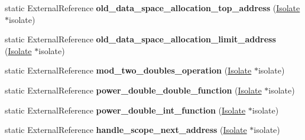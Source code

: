\begin{DoxyCompactItemize}
\item 
\hypertarget{classv8_1_1internal_1_1_b_a_s_e___e_m_b_e_d_d_e_d_a942984857e5337d7c42f8c46a2c7ce72}{}static External\+Reference {\bfseries old\+\_\+data\+\_\+space\+\_\+allocation\+\_\+top\+\_\+address} (\hyperlink{classv8_1_1internal_1_1_isolate}{Isolate} $\ast$isolate)\label{classv8_1_1internal_1_1_b_a_s_e___e_m_b_e_d_d_e_d_a942984857e5337d7c42f8c46a2c7ce72}

\item 
\hypertarget{classv8_1_1internal_1_1_b_a_s_e___e_m_b_e_d_d_e_d_a997b6a6749403f587c2a98901a559fda}{}static External\+Reference {\bfseries old\+\_\+data\+\_\+space\+\_\+allocation\+\_\+limit\+\_\+address} (\hyperlink{classv8_1_1internal_1_1_isolate}{Isolate} $\ast$isolate)\label{classv8_1_1internal_1_1_b_a_s_e___e_m_b_e_d_d_e_d_a997b6a6749403f587c2a98901a559fda}

\item 
\hypertarget{classv8_1_1internal_1_1_b_a_s_e___e_m_b_e_d_d_e_d_afcd485b57431a72f941f38e4b14450f5}{}static External\+Reference {\bfseries mod\+\_\+two\+\_\+doubles\+\_\+operation} (\hyperlink{classv8_1_1internal_1_1_isolate}{Isolate} $\ast$isolate)\label{classv8_1_1internal_1_1_b_a_s_e___e_m_b_e_d_d_e_d_afcd485b57431a72f941f38e4b14450f5}

\item 
\hypertarget{classv8_1_1internal_1_1_b_a_s_e___e_m_b_e_d_d_e_d_a2d62b10a13ad4d099f9acfdf1f4956a8}{}static External\+Reference {\bfseries power\+\_\+double\+\_\+double\+\_\+function} (\hyperlink{classv8_1_1internal_1_1_isolate}{Isolate} $\ast$isolate)\label{classv8_1_1internal_1_1_b_a_s_e___e_m_b_e_d_d_e_d_a2d62b10a13ad4d099f9acfdf1f4956a8}

\item 
\hypertarget{classv8_1_1internal_1_1_b_a_s_e___e_m_b_e_d_d_e_d_a3664689d2802210f6426d4c8259df23e}{}static External\+Reference {\bfseries power\+\_\+double\+\_\+int\+\_\+function} (\hyperlink{classv8_1_1internal_1_1_isolate}{Isolate} $\ast$isolate)\label{classv8_1_1internal_1_1_b_a_s_e___e_m_b_e_d_d_e_d_a3664689d2802210f6426d4c8259df23e}

\item 
\hypertarget{classv8_1_1internal_1_1_b_a_s_e___e_m_b_e_d_d_e_d_a48f07788b4be8fe888a31d595bbf64e6}{}static External\+Reference {\bfseries handle\+\_\+scope\+\_\+next\+\_\+address} (\hyperlink{classv8_1_1internal_1_1_isolate}{Isolate} $\ast$isolate)\label{classv8_1_1internal_1_1_b_a_s_e___e_m_b_e_d_d_e_d_a48f07788b4be8fe888a31d595bbf64e6}


\end{DoxyCompactItemize}
